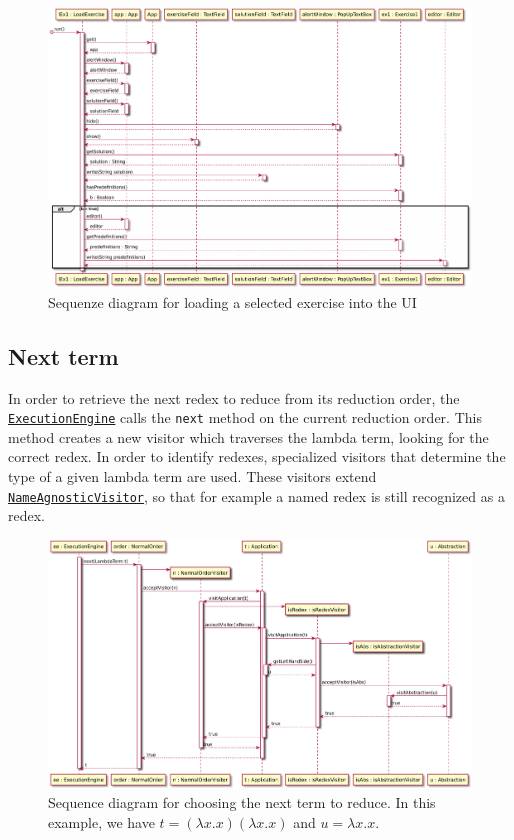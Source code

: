 \begin{figure}[H]
	\centering
	\includegraphics[width=\textwidth]{sequenceDiagrams/loadExercise}
	\caption{Sequenze diagram for loading a selected exercise into the UI}
\end{figure}

\subsection{Next term}
\label{sec:nt}
In order to retrieve the next redex to reduce from its reduction order, the
\texttt{\hyperref[type:edu.kit.wavelength.client.model.ExecutionEngine]{ExecutionEngine}}
calls the \texttt{next} method on the current reduction order. This method creates a new visitor which traverses
the lambda term, looking for the correct redex. In order to identify redexes,
specialized visitors that determine the type of a given lambda term are used.
These visitors extend \texttt{\hyperref[type:edu.kit.wavelength.client.model.term.NameAgnosticVisitor]{NameAgnosticVisitor}},
so that for example a named redex is still recognized as a redex.



\begin{figure}[H]
	\centering
	\includegraphics[width=\textwidth]{sequenceDiagrams/nextTerm}
	\caption{Sequence diagram for choosing the next term to reduce. In this example, we have $t = (\lambda x.x)(\lambda x.x)$ and $u = \lambda x.x$.}
\end{figure}


